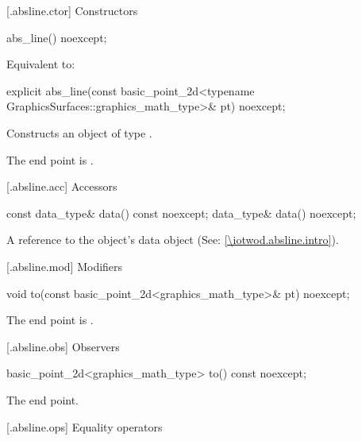  [\iotwod.absline.ctor] {Constructors}%

%
\begin{itemdecl}
abs_line() noexcept;
\end{itemdecl}
\begin{itemdescr}
\pnum
\effects Equivalent to: 
\end{itemdescr}

%
\begin{itemdecl}
explicit abs_line(const basic_point_2d<typename
  GraphicsSurfaces::graphics_math_type>& pt) noexcept;
\end{itemdecl}
\begin{itemdescr}
\pnum
\effects Constructs an object of type .

\pnum
\remarks The end point is .
\end{itemdescr}

 [\iotwod.absline.acc] {Accessors}%

%
\begin{itemdecl}
const data_type& data() const noexcept;
data_type& data() noexcept;
\end{itemdecl}
\begin{itemdescr}
\pnum
\returns A reference to the  object's data object (See: \ref{\iotwod.absline.intro}).
\end{itemdescr}

 [\iotwod.absline.mod] {Modifiers}%

%
\begin{itemdecl}
void to(const basic_point_2d<graphics_math_type>& pt) noexcept;
\end{itemdecl}
\begin{itemdescr}
\pnum
\effects The end point is .
\end{itemdescr}

 [\iotwod.absline.obs] {Observers} 

%
\begin{itemdecl}
basic_point_2d<graphics_math_type> to() const noexcept;
\end{itemdecl}
\begin{itemdescr}
\pnum
\returns The end point.
\end{itemdescr}

 [\iotwod.absline.ops] {Equality operators}%

